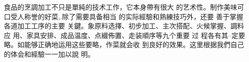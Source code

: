 食品的烹調加工不只是單純的技术工作，它本身帶有很大 的艺术性。制作美味可口受人称誉的好菜,.除了需要具备相当 的实际經驗和熟練技巧外，还要
善于掌握各道加工工序的主要 关鍵。象原料选擇、初步加工、主次搭配、火候掌握、調料应 用、家具安排、成品温度、点綴佈置、走装順序等九个重要
过 程各有其--定要略。如能够正确地运用这些要略，作菜就会收 到良好的效果。这里根据我們自己的体会和經驗一一加以說 明。
